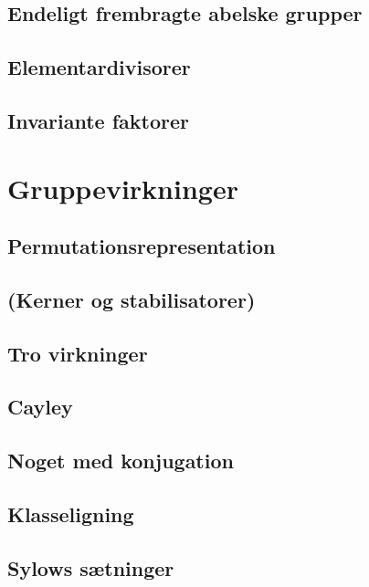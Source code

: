 \documentclass[11pt]{article}
\begin{document}
\subsection*{Endeligt frembragte abelske grupper}
\subsection*{Elementardivisorer}
\subsection*{Invariante faktorer}

\section*{Gruppevirkninger}
\subsection*{Permutationsrepresentation}
\subsection*{(Kerner og stabilisatorer)}
\subsection*{Tro virkninger}
\subsection*{Cayley}
\subsection*{Noget med konjugation}
\subsection*{Klasseligning}
\subsection*{Sylows sætninger}
\end{document}

